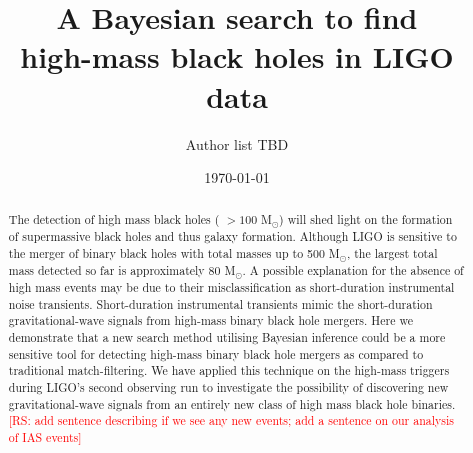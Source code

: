 \documentclass[%
preprint,
 amsmath,amssymb,
 aps,
]{revtex4}
\newcommand{\msun}{{\sc M${}_\odot$}\xspace}
\newcommand{\rs}[1]{\textcolor{red}{[RS: #1]}}
\begin{document}

\title{A Bayesian search to find \\high-mass black holes in LIGO data}%



\author{Author list TBD}

\date{\today}

\begin{abstract}

The detection of high mass black holes ( $>100$ \msun) will shed light on the formation of supermassive black holes and thus galaxy formation. Although LIGO is sensitive to the merger of binary black holes with total masses up to 500 \msun, the largest total mass detected so far is approximately $80$ \msun. A possible explanation for the absence of high mass events may be due to their misclassification as short-duration instrumental noise transients. Short-duration instrumental transients mimic the short-duration gravitational-wave signals from high-mass binary black hole mergers. Here we demonstrate that a new search method utilising Bayesian inference could be a more sensitive tool for detecting high-mass binary black hole mergers as compared to traditional match-filtering. We have applied this technique on the high-mass triggers during LIGO's second observing run to investigate the possibility of discovering new gravitational-wave signals from an entirely new class of high mass black hole binaries. \rs{add sentence describing if we see any new events; add a sentence on our analysis of IAS events}



\end{abstract}

\maketitle



\end{document}

